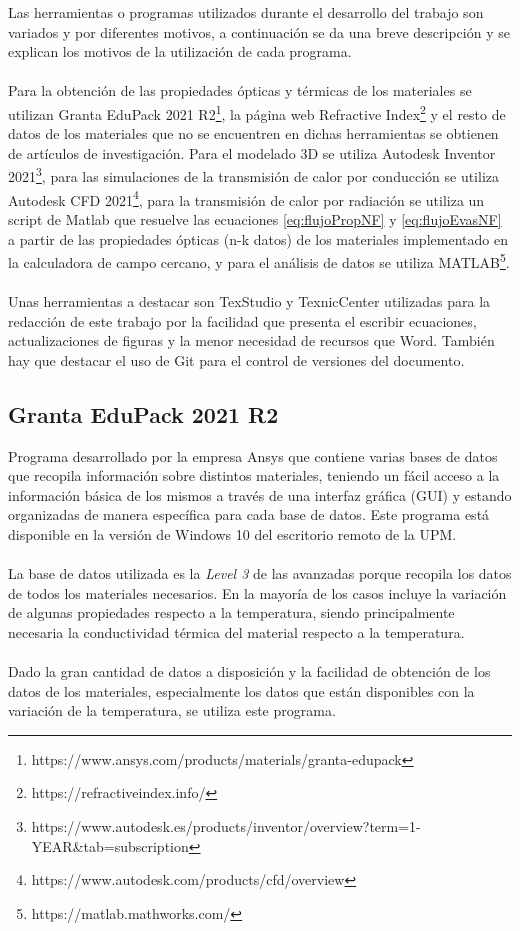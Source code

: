 Las herramientas o programas utilizados durante el desarrollo del trabajo son variados y por diferentes motivos, a continuación se da una breve descripción y se explican los motivos de la utilización de cada programa.\\\\
Para la obtención de las propiedades ópticas y térmicas de los materiales se utilizan Granta EduPack 2021 R2\footnote{https://www.ansys.com/products/materials/granta-edupack}, la página web Refractive Index\footnote{https://refractiveindex.info/} y el resto de datos de los materiales que no se encuentren en dichas herramientas se obtienen de artículos de investigación. Para el modelado 3D se utiliza Autodesk Inventor 2021\footnote{https://www.autodesk.es/products/inventor/overview?term=1-YEAR\&tab=subscription}, para las simulaciones de la transmisión de calor por conducción se utiliza Autodesk CFD 2021\footnote{https://www.autodesk.com/products/cfd/overview}, para la transmisión de calor por radiación se utiliza un script de Matlab que resuelve las ecuaciones \eqref{eq:flujoPropNF} y \eqref{eq:flujoEvasNF} a partir de las propiedades ópticas (n-k datos) de los materiales implementado en la calculadora de campo cercano, y para el análisis de datos se utiliza MATLAB\footnote{https://matlab.mathworks.com/}.\\\\
Unas herramientas a destacar son TexStudio y TexnicCenter utilizadas para la redacción de este trabajo por la facilidad que presenta el escribir ecuaciones, actualizaciones de figuras y la menor necesidad de recursos que Word. También hay que destacar el uso de Git para el control de versiones del documento.\\
\subsection{Granta EduPack 2021 R2}
Programa desarrollado por la empresa Ansys que contiene varias bases de datos que recopila información sobre distintos materiales, teniendo un fácil acceso a la información básica de los mismos a través de una interfaz gráfica (GUI) y estando organizadas de manera específica para cada base de datos. Este programa está disponible en la versión de Windows 10 del escritorio remoto de la UPM.\\\\
La base de datos utilizada es la \textit{Level 3} de las avanzadas porque recopila los datos de todos los materiales necesarios. En la mayoría de los casos incluye la variación de algunas propiedades respecto a la temperatura, siendo principalmente necesaria la conductividad térmica del material respecto a la temperatura.\\\\
Dado la gran cantidad de datos a disposición y la facilidad de obtención de los datos de los materiales, especialmente los datos que están disponibles con la variación de la temperatura, se utiliza este programa.
